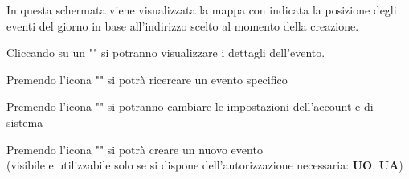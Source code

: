 \documentclass{article}
\begin{document}
\begin{description}
\begin{center}
        \end{center}
    \item[] In questa schermata viene visualizzata la mappa con indicata la posizione degli eventi del giorno in base all'indirizzo scelto al momento della creazione.
    \item[] Cliccando su un "" si potranno visualizzare i dettagli dell'evento.
    \item[] Premendo l'icona "" si potrà ricercare un evento specifico
    \item[] Premendo l'icona "" si potranno cambiare le impostazioni dell'account e di sistema
    \item[] Premendo l'icona "" si potrà creare un nuovo evento \\ (visibile e utilizzabile solo se si dispone dell'autorizzazione necessaria: \textbf{UO}, \textbf{UA})
\end{description}
\clearpage
\end{document}
